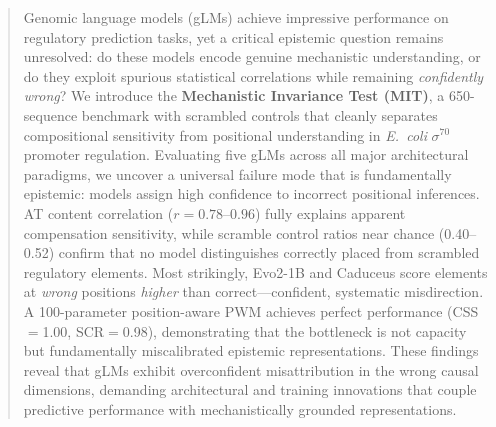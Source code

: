 \documentclass{article}
\begin{document}

\printAffiliationsAndNotice{}

\begin{abstract}
Genomic language models (gLMs) achieve impressive performance on regulatory prediction
tasks, yet a critical epistemic question remains unresolved: do these models encode genuine
mechanistic understanding, or do they exploit spurious statistical correlations while
remaining \emph{confidently wrong}?
We introduce the \textbf{Mechanistic Invariance Test (MIT)}, a 650-sequence benchmark with
scrambled controls that cleanly separates compositional sensitivity from positional
understanding in \textit{E.\ coli} $\sigma^{70}$ promoter regulation.
Evaluating five gLMs across all major architectural paradigms, we uncover a universal failure
mode that is fundamentally epistemic: models assign high confidence to incorrect positional
inferences.
AT content correlation ($r{=}0.78$--$0.96$) fully explains apparent compensation sensitivity,
while scramble control ratios near chance (0.40--0.52) confirm that no model distinguishes
correctly placed from scrambled regulatory elements.
Most strikingly, Evo2-1B and Caduceus score elements at \emph{wrong} positions
\emph{higher} than correct---confident, systematic misdirection.
A 100-parameter position-aware PWM achieves perfect performance
(CSS$=$1.00, SCR$=$0.98), demonstrating that the bottleneck is not capacity but
fundamentally miscalibrated epistemic representations.
These findings reveal that gLMs exhibit overconfident misattribution in the wrong causal
dimensions, demanding architectural and training innovations that couple predictive
performance with mechanistically grounded representations.
\end{abstract}

\end{document}
